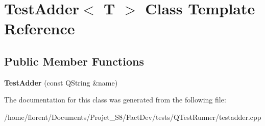\hypertarget{classTestAdder}{\section{Test\-Adder$<$ T $>$ Class Template Reference}
\label{classTestAdder}
}
\subsection*{Public Member Functions}
\begin{DoxyCompactItemize}
\item 
\hypertarget{classTestAdder_a64f9008ae27868e36acdd5c94eebae3b}{{\bfseries Test\-Adder} (const Q\-String \&name)}\label{classTestAdder_a64f9008ae27868e36acdd5c94eebae3b}

\end{DoxyCompactItemize}


The documentation for this class was generated from the following file\-:\begin{DoxyCompactItemize}
\item 
/home/florent/\-Documents/\-Projet\-\_\-\-S8/\-Fact\-Dev/tests/\-Q\-Test\-Runner/testadder.\-cpp\end{DoxyCompactItemize}
